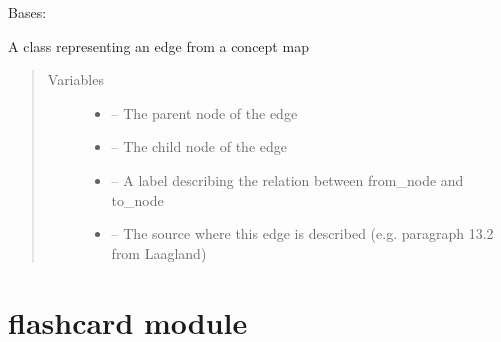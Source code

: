 \documentclass[letterpaper,10pt,english]{sphinxmanual}
\begin{document}
\begin{fulllineitems}
\label{\detokenize{edge:edge.Edge}}
Bases: 

A class representing an edge from a concept map
\begin{quote}\begin{description}
\item[{Variables}] \leavevmode\begin{itemize}
\item {} 
 -- The parent node of the edge

\item {} 
 -- The child node of the edge

\item {} 
 -- A label describing the relation between from\_node and to\_node

\item {} 
 -- The source where this edge is described (e.g. paragraph 13.2 from Laagland)

\end{itemize}

\end{description}\end{quote}

\end{fulllineitems}



\chapter{flashcard module}
\label{\detokenize{flashcard:module-flashcard}}\label{\detokenize{flashcard:flashcard-module}}\label{\detokenize{flashcard::doc}}
\end{document}
